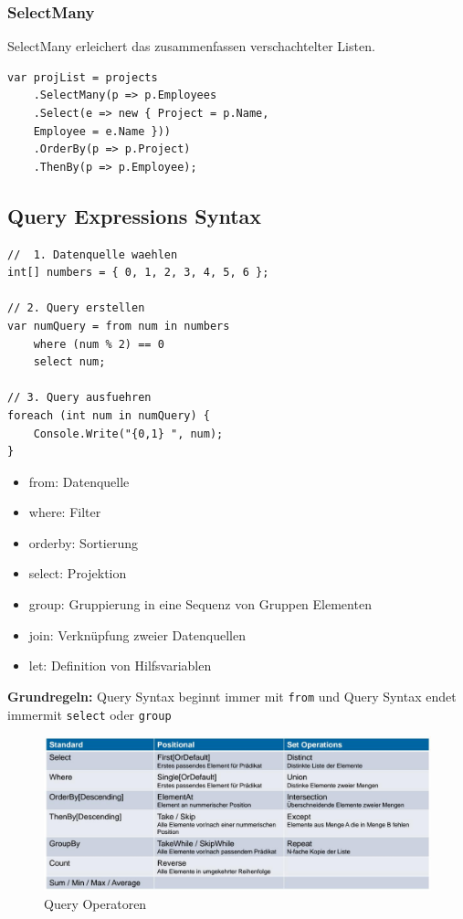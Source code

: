 \documentclass[
a4paper,
oneside,
10pt,
fleqn,
headsepline,
toc=listofnumbered, 
bibliography=totocnumbered]{scrartcl}
\begin{document}
\subsubsection{SelectMany}
SelectMany erleichert das zusammenfassen verschachtelter Listen. 
\begin{lstlisting}
var projList = projects
	.SelectMany(p => p.Employees
	.Select(e => new { Project = p.Name, 
	Employee = e.Name }))
	.OrderBy(p => p.Project)
	.ThenBy(p => p.Employee);
\end{lstlisting}


\subsection{Query Expressions Syntax}
\begin{lstlisting}
//  1. Datenquelle waehlen
int[] numbers = { 0, 1, 2, 3, 4, 5, 6 };

// 2. Query erstellen
var numQuery = from num in numbers
	where (num % 2) == 0
	select num;

// 3. Query ausfuehren
foreach (int num in numQuery) {
	Console.Write("{0,1} ", num);
}
\end{lstlisting}

\begin{itemize}
	\item from: Datenquelle
	\item where: Filter
	\item orderby: Sortierung
	\item select: Projektion
	\item group:  Gruppierung in eine Sequenz von Gruppen Elementen
	\item join: Verknüpfung zweier Datenquellen
	\item let: Definition von Hilfsvariablen
\end{itemize}
\textbf{Grundregeln:} Query Syntax beginnt immer mit \lstinline|from| und Query Syntax endet immermit \lstinline|select| oder \lstinline|group| 
\begin{figure}[h]
\centering
\includegraphics[width=\linewidth]{images/linq_query_operatoren}
\caption{Query Operatoren}
\label{fig:linqqueryoperatoren}
\end{figure}
\end{document}
